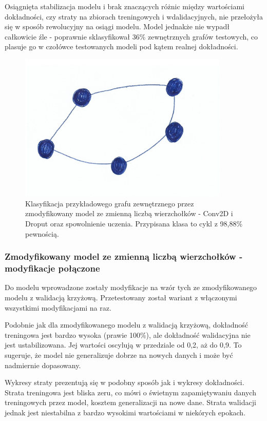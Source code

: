 Osiągnięta stabilizacja modelu i brak znaczących różnic między wartościami dokładności,
czy straty na zbiorach treningowych i wdalidacyjnych, nie przełożyła się w sposób rewolucyjny na osiągi modelu.
Model jednakże nie wypadł całkowicie źle - poprawnie sklasyfikował 36\% zewnętrznych grafów testowych,
co plasuje go w czołówce testowanych modeli pod kątem realnej dokładności.

\begin{figure}[ht]
	\centering
	\includegraphics[width=10cm]{../graph_classification/test_graphs/drawn/cycle-7.png}
	\caption{Klasyfikacja przykładowego grafu zewnętrznego przez zmodyfikowany model ze zmienną liczbą wierzchołków
		- Conv2D i Droput oraz spowolnienie uczenia.
		Przypisana klasa to cykl z 98,88\% pewnością.}
	\label{Fig:tests-var-1d}
\end{figure}
\FloatBarrier

\subsubsection{Zmodyfikowany model ze zmienną liczbą wierzchołków - modyfikacje połączone}

Do modelu wprowadzone zostały modyfikacje na wzór tych ze zmodyfikowanego modelu z walidacją krzyżową.
Przetestowany został wariant z włączonymi wszystkimi modyfikacjami na raz.

Podobnie jak dla zmodyfikowanego modelu z walidacją krzyżową, dokładność treningowa jest bardzo wysoka (prawie 100\%),
ale dokładność walidacyjna nie jest ustabilizowana. Jej wartości oscylują w przedziale od 0,2, aż do 0,9.
To sugeruje, że model nie generalizuje dobrze na nowych danych i może być nadmiernie dopasowany.

Wykresy straty prezentują się w podobny sposób jak i wykresy dokładności.
Strata treningowa jest bliska zeru, co mówi o świetnym zapamiętywaniu danych treningowych przez model, kosztem generalizacji na nowe dane.
Strata walidacji jednak jest niestabilna z bardzo wysokimi wartościami w niekórych epokach.

